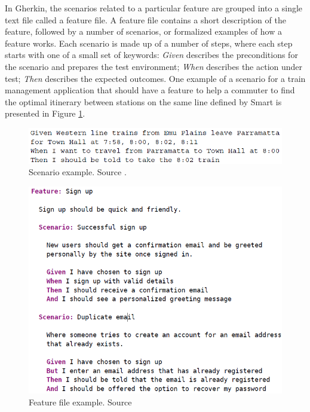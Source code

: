In Gherkin, the scenarios related to a particular feature are grouped into a single text file called a feature file. A feature file contains a short description of the feature, followed by a number of scenarios, or formalized examples of how a feature works. Each scenario is made up of a number of steps, where each step starts with one of a small set of keywords: \textit{Given} describes the preconditions for the scenario and prepares the test environment; \textit{When} describes the action under test; \textit{Then} describes the expected outcomes. One example of a scenario for a train management application that should have a feature to help a commuter to find the optimal itinerary between stations on the same line defined by Smart \cite{Smart_2014} is presented in Figure \ref{fig:scenario_example}.

\begin{figure}[t]
\centering
\includegraphics[scale=0.7]{images/smart_scenario_example}
\caption[Scenario example]{Scenario example. Source \cite{Smart_2014}.}
\label{fig:scenario_example}
\end{figure}

\begin{figure}[t]
\centering
\includegraphics[scale=0.7]{images/feature_file_example}
\caption[Feature file example]{Feature file example. Source \cite{Wynne_and_Hellesoy_2012}}
\label{fig:feature_file}
\end{figure}

